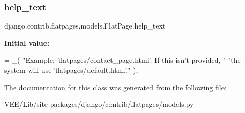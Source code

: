 \subsubsection{\texorpdfstring{help\+\_\+text}{help\_text}}
{\footnotesize\ttfamily django.\+contrib.\+flatpages.\+models.\+Flat\+Page.\+help\+\_\+text\hspace{0.3cm}{\ttfamily [static]}}

{\bfseries Initial value\+:}
\begin{DoxyCode}
= \_(
            \textcolor{stringliteral}{"Example: 'flatpages/contact\_page.html'. If this isn't provided, "}
            \textcolor{stringliteral}{"the system will use 'flatpages/default.html'."}
        ),
\end{DoxyCode}


The documentation for this class was generated from the following file\+:\begin{DoxyCompactItemize}
\item 
V\+E\+E/\+Lib/site-\/packages/django/contrib/flatpages/models.\+py\end{DoxyCompactItemize}

